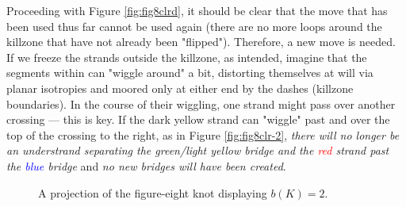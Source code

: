 \documentclass[titlepage]{article}
\begin{document}
Proceeding with Figure \ref{fig:fig8clrd}, it should be clear that the move that has been used thus far cannot be used again (there are no more loops around the killzone that have not already been "flipped"). Therefore, a new move is needed. If we freeze the strands outside the killzone, as intended, imagine that the segments within can "wiggle around" a bit, distorting themselves at will via planar isotropies and moored only at either end by the dashes (killzone boundaries). In the course of their wiggling, one strand might pass over another crossing --- this is key. If the \textcolor{yly}{dark yellow} strand can "wiggle" past and over the top of the crossing to the right, as in Figure \ref{fig:fig8clr-2}, \emph{there will no longer be an understrand separating the \textcolor{grx}{green}/\textcolor{ylz}{light yellow} bridge and the \textcolor{red}{red} strand past the \textcolor{blue}{blue} bridge} and \emph{no new bridges will have been created}.\par

\begin{figure}[h!]
    \centering
    \caption{A projection of the figure-eight knot displaying $b(K)=2$.}
    \label{fig:fig8fin}
\end{figure}
\end{document}
